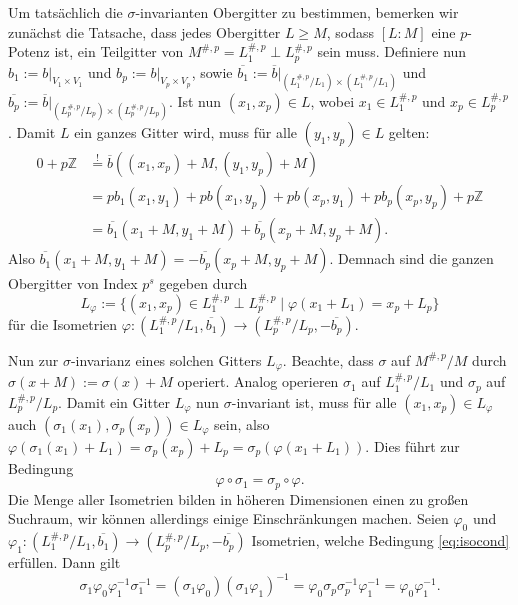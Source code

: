 \documentclass[12pt,a4paper,halfparskip,headsepline,bibtotocnumbered]{scrreprt}
\theoremstyle{nummermitklammern}
\theoremstyle{nonumberbreak}
\newcommand{\Z}{\mathbb{Z}}
\begin{document}
Um tatsächlich die $\sigma$-invarianten Obergitter zu bestimmen, bemerken wir zunächst die Tatsache, dass jedes Obergitter $L \geq M$, sodass $[L : M]$ eine $p$-Potenz ist, ein Teilgitter von $M^{\#,p} = L_1^{\#,p} \perp L_p^{\#,p}$ sein muss. Definiere nun $b_1 := b \vert_{V_1 \times V_1}$ und $b_p := b \vert_{V_p \times V_p}$, sowie $\overline{b_1} := \overline{b}\vert_{(L_1^{\#,p} / L_1) \times (L_1^{\#,p} / L_1)}$ und $\overline{b_p} := \overline{b}\vert_{(L_p^{\#,p} / L_p) \times (L_p^{\#,p} / L_p)}$. Ist nun $(x_1,x_p) \in L$, wobei $x_1 \in L_1^{\#,p}$ und $x_p \in L_p^{\#,p}$. Damit $L$ ein ganzes Gitter wird, muss für alle $(y_1, y_p) \in L$ gelten:
\begin{align*}
	0 + p\Z &\stackrel{!}{=} \overline{b}((x_1,x_p) + M, (y_1, y_p) + M)\\
	&= pb_1(x_1,y_1) + pb(x_1, y_p) + pb(x_p, y_1) + pb_p(x_p, y_p) + p\Z\\
	&= \overline{b_1}(x_1+M, y_1 + M) + \overline{b_p}(x_p+M, y_p+M).
\end{align*}
Also $\overline{b_1}(x_1+M, y_1+M) = - \overline{b_p}(x_p+M, y_p+M)$. Demnach sind die ganzen Obergitter von Index $p^s$ gegeben durch
\begin{equation*}
	L_\varphi := \lbrace (x_1,x_p) \in L_1^{\#,p} \perp L_p^{\#,p} \mid \varphi(x_1+L_1) = x_p + L_p \rbrace
\end{equation*}
für die Isometrien $\varphi : (L_1^{\#,p} / L_1, \overline{b_1}) \rightarrow (L_p^{\#,p} / L_p, -\overline{b_p})$.\par
Nun zur $\sigma$-invarianz eines solchen Gitters $L_\varphi$. Beachte, dass $\sigma$ auf $M^{\#,p}/M$ durch $\sigma(x+M) := \sigma(x) + M$ operiert. Analog operieren $\sigma_1$ auf $L_1^{\#,p}/L_1$ und $\sigma_p$ auf $L_p^{\#,p}/L_p$. Damit ein Gitter $L_\varphi$ nun $\sigma$-invariant ist, muss für alle $(x_1,x_p) \in L_\varphi$ auch $(\sigma_1(x_1), \sigma_p(x_p)) \in L_\varphi$ sein, also $\varphi(\sigma_1(x_1) + L_1) = \sigma_p(x_p) + L_p = \sigma_p(\varphi(x_1 + L_1))$. Dies führt zur Bedingung
\begin{equation}\label{eq:isocond}
\varphi \circ \sigma_1 = \sigma_p \circ \varphi.
\end{equation}
Die Menge aller Isometrien bilden in höheren Dimensionen einen zu großen Suchraum, wir können allerdings einige Einschränkungen machen. Seien $\varphi_0$ und $\varphi_1 : (L_1^{\#,p} / L_1, \overline{b_1}) \rightarrow (L_p^{\#,p} / L_p, -\overline{b_p})$ Isometrien, welche Bedingung \eqref{eq:isocond} erfüllen. Dann gilt
\begin{equation*}
	\sigma_1 \varphi_0 \varphi_1^{-1} \sigma_1^{-1} = (\sigma_1 \varphi_0) (\sigma_1 \varphi_1)^{-1} = \varphi_0 \sigma_p \sigma_p^{-1} \varphi_1^{-1} = \varphi_0 \varphi_1^{-1}.
\end{equation*}
\end{document}
